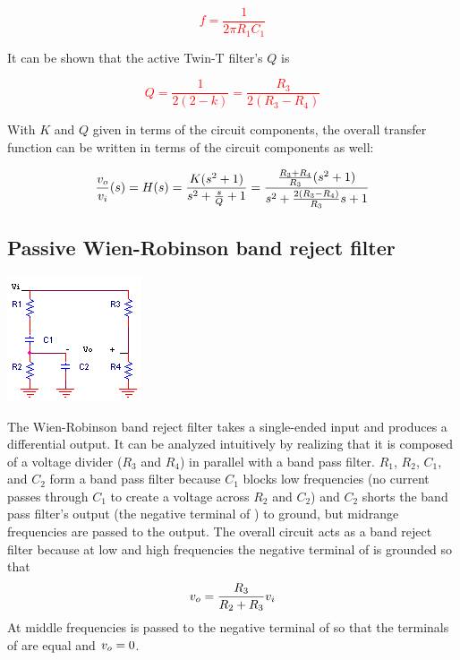 \textcolor{red}{
\begin{equation}
f = \frac{1}{2\pi R_1 C_1}
\end{equation}
}

It can be shown \autocite[322]{op-amps-for-everyone} that the active Twin-T filter's $Q$ is

\textcolor{red}{
\begin{equation}
Q = \frac{1}{2(2-k)} = \frac{R_3}{2(R_3 - R_4)}
\end{equation}
}

With $K$ and $Q$ given in terms of the circuit components, the overall transfer function can be written in terms of the circuit components as well:

\textcolor{red}{
\begin{equation}
\frac{\vout}{\vin}(s) = \Hs = \frac{K(s^2 + 1)}{s^2 + \frac{s}{Q} + 1} = \frac{\frac{R_3 + R_4}{R_3}(s^2 + 1)}{s^2 + \frac{2(R_3 - R_4)}{R_3}s+1}
\end{equation}
}

\subsection{Passive Wien-Robinson band reject filter}
\begin{center}
	\includegraphics{schematics/passiveWien-Robinsonbandrejectfilter.PNG}
\end{center}
The Wien-Robinson band reject filter takes a single-ended input and produces a differential output.
It can be analyzed intuitively by realizing that it is composed of a voltage divider ($R_3$ and $R_4$) in parallel with a band pass filter.
$R_1$, $R_2$, $C_1$, and $C_2$ form a band pass filter because $C_1$ blocks low frequencies (no current passes through $C_1$ to create a voltage across $R_2$ and $C_2$) and $C_2$ shorts the band pass filter's output (the negative terminal of \vout) to ground, but midrange frequencies are passed to the output.
The overall circuit acts as a band reject filter because at low and high frequencies the negative terminal of \vout is grounded so that \[\vout = \frac{R_3}{R_2 + R_3}\vin\]
At middle frequencies \vin is passed to the negative terminal of \vout so that the terminals of \vout are equal and $\vout = 0$.

